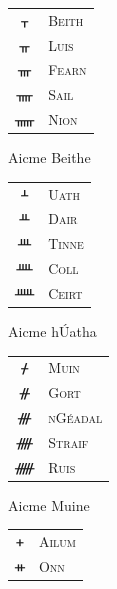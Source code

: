 \documentclass[a4paper]{scrartcl}
\begin{document}
\begin{table}[p]
  \begin{center}
    \begin{subfigure}[c]{0.24\textwidth}
      \centering
      \begin{tabular}{cl}
        {\oghamfont ᚁ} & \textsc{Beith} \\
        {\oghamfont ᚂ} & \textsc{Luis} \\
        {\oghamfont ᚃ} & \textsc{Fearn} \\
        {\oghamfont ᚄ} & \textsc{Sail} \\
        {\oghamfont ᚅ} & \textsc{Nion} \\
      \end{tabular}
      \caption{Aicme Beithe}
    \end{subfigure}
    \begin{subfigure}[c]{0.24\textwidth}
      \centering
      \begin{tabular}{cl}
        {\oghamfont ᚆ} & \textsc{Uath} \\
        {\oghamfont ᚇ} & \textsc{Dair} \\
        {\oghamfont ᚈ} & \textsc{Tinne} \\
        {\oghamfont ᚉ} & \textsc{Coll} \\
        {\oghamfont ᚊ} & \textsc{Ceirt} \\
      \end{tabular}
      \caption{Aicme hÚatha}
    \end{subfigure}
    \begin{subfigure}[c]{0.24\textwidth}
      \centering
      \begin{tabular}{cl}
        {\oghamfont ᚋ} & \textsc{Muin} \\
        {\oghamfont ᚌ} & \textsc{Gort} \\
        {\oghamfont ᚍ} & \textsc{nGéadal} \\
        {\oghamfont ᚎ} & \textsc{Straif} \\
        {\oghamfont ᚏ} & \textsc{Ruis} \\
      \end{tabular}
      \caption{Aicme Muine}
    \end{subfigure}\vspace{30pt}
    \begin{subfigure}[c]{0.24\textwidth}
      \centering
      \begin{tabular}{cl}
        {\oghamfont ᚐ} & \textsc{Ailum} \\
        {\oghamfont ᚑ} & \textsc{Onn} \\

\end{tabular}
\end{subfigure}
\end{center}
\end{table}
\end{document}
